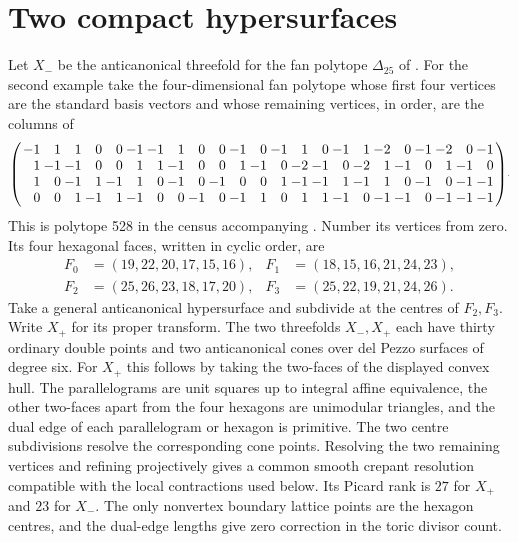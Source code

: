 \section{Two compact hypersurfaces}\label{sec:examples}

Let $X_-$ be the anticanonical threefold for the fan polytope
$\Delta_{25}$ of \cite[\S5]{W5}. For the second example take the
four-dimensional fan polytope whose first four vertices are the
standard basis vectors and whose remaining vertices, in order, are the
columns of
\[
{\setlength{\arraycolsep}{1.2pt}\scriptscriptstyle
\left(\begin{array}{*{23}{r}}
-1&1&1&0&0&-1&-1&1&0&0&-1&0&-1&1&0&-1&1&-2&0&-1&-2&0&-1\\
1&-1&-1&0&0&1&1&-1&0&0&1&-1&0&-2&-1&0&-2&1&-1&0&1&-1&0\\
1&0&-1&1&-1&1&0&-1&0&-1&0&0&1&-1&-1&1&-1&1&0&-1&0&-1&-1\\
0&0&1&-1&1&-1&0&0&-1&0&-1&1&0&1&1&-1&0&-1&-1&0&-1&-1&-1
\end{array}\right).}
\]
This is polytope 528 in the census accompanying \cite{W5}. Number
its vertices from zero. Its four hexagonal faces, written in cyclic
order, are
\[
\begin{aligned}
 F_0&=(19,22,20,17,15,16),& F_1&=(18,15,16,21,24,23),\\
 F_2&=(25,26,23,18,17,20),& F_3&=(25,22,19,21,24,26).
\end{aligned}
\]
Take a general anticanonical hypersurface and subdivide at the
centres of $F_2,F_3$. Write $X_+$ for its proper transform. The two
threefolds $X_-,X_+$ each have thirty ordinary double points and two
anticanonical cones over del Pezzo surfaces of degree six. For $X_+$
this follows by taking the two-faces of the displayed convex hull.
The parallelograms are unit squares up to integral affine
equivalence, the other two-faces apart from the four hexagons are
unimodular triangles, and the dual edge of each parallelogram or
hexagon is primitive. The two centre subdivisions resolve the
corresponding cone points. Resolving the two remaining vertices and
refining projectively gives a common smooth crepant resolution
compatible with the local contractions used below. Its Picard rank is
$27$ for $X_+$ and $23$ for $X_-$. The only nonvertex boundary
lattice points are the hexagon centres, and the dual-edge lengths
give zero correction in the toric divisor count.

